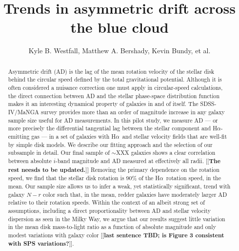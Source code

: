 \documentclass[apj,iop,revtex4,numberedappendix]{emulateapj}
\newcommand{\comment}[2][todo]{{\color{#1}[[{\bf #2}]]}}
\newcommand{\halpha}{H$\alpha$}
\begin{document}
\title{ Trends in asymmetric drift across the blue cloud }

\author{ Kyle B. Westfall, Matthew A.
Bershady, Kevin Bundy, et al. }





\begin{abstract}

Asymmetric drift (AD) is the lag of the mean rotation velocity of the
stellar disk behind the circular speed defined by the total
gravitational potential.  Although it is often considered a nuisance
correction one must apply in circular-speed calculations, the direct
connection between AD and the stellar phase-space distribution function
makes it an interesting dynamical property of galaxies in and of itself.
The SDSS-IV/MaNGA survey provides more than an order of magnitude
increase in any galaxy sample size useful for AD measurements.  In this
pilot study, we measure AD --- or more precisely the differential
tangential lag between the stellar component and \halpha-emitting gas
--- in a set of galaxies with \halpha\ and stellar velocity fields that
are well-fit by simple disk models.  We describe our fitting approach
and the selection of our subsample in detail.  Our final sample of
$\sim$XXX galaxies shows a clear correlation between absolute $i$-band
magnitude and AD measured at effectively all radii.  \comment{The rest
neesds to be updated.} Removing the primary dependence on the rotation
speed, we find that the stellar disk rotation is 90\% of the \halpha\
rotation speed, in the mean.  Our sample size allows us to infer a weak,
yet statistically significant, trend with galaxy $N-r$ color such that,
in the mean, redder galaxies have moderately larger AD relative to their
rotation speeds.  Within the context of an albeit strong set of
assumptions, including a direct proportionality between AD and stellar
velocity dispersion as seen in the Milky Way, we argue that our results
suggest little variation in the mean disk mass-to-light ratio as a
function of absolute magnitude and only modest variations with galaxy
color \comment{last sentence TBD; is Figure 3 consistent with SPS
variations?}.

\end{abstract}
\end{document}
